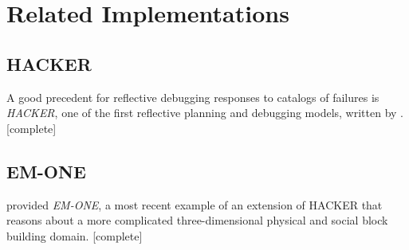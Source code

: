 \chapter{Related Implementations}
\label{chapter:related_implementations}

\section{HACKER}

A good precedent for reflective debugging responses to catalogs of
failures is \emph{HACKER}, one of the first reflective planning and
debugging models, written by \cite{sussman:1973}.  [complete]

\section{EM-ONE}

\cite{singh:2005} provided \emph{EM-ONE}, a most recent example of an
extension of HACKER that reasons about a more complicated
three-dimensional physical and social block building domain.
[complete]

